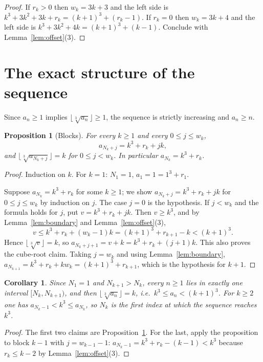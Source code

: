 \documentclass[11pt]{amsart}
\newtheorem{proposition}[theorem]{Proposition}
\newtheorem{corollary}[theorem]{Corollary}
\theoremstyle{remark}
\newcommand{\cbrt}[1]{\bigl\lfloor\sqrt[3]{#1}\bigr\rfloor}
\begin{document}
\begin{proof}
If $r_k>0$ then $w_k=3k+3$ and the left side is $k^3+3k^2+3k+r_k=(k+1)^3+(r_k-1)$.
If $r_k=0$ then $w_k=3k+4$ and the left side is $k^3+3k^2+4k=(k+1)^3+(k-1)$.
Conclude with Lemma~\ref{lem:offset}(3).
\end{proof}

\section{The exact structure of the sequence}

Since $a_n\ge1$ implies $\cbrt{a_n}\ge1$, the sequence is strictly increasing and $a_n\ge n$.

\begin{proposition}[Blocks]\label{prop:blocks}
For every $k\ge1$ and every $0\le j\le w_k$,
\[
  a_{N_k+j}=k^3+r_k+jk,
\]
and $\cbrt{a_{N_k+j}}=k$ for $0\le j<w_k$. In particular $a_{N_k}=k^3+r_k$.
\end{proposition}

\begin{proof}
Induction on $k$. For $k=1$: $N_1=1$, $a_1=1=1^3+r_1$.

Suppose $a_{N_k}=k^3+r_k$ for some $k\ge1$; we show $a_{N_k+j}=k^3+r_k+jk$ for
$0\le j\le w_k$ by induction on $j$. The case $j=0$ is the hypothesis. If $j<w_k$ and the
formula holds for $j$, put $v=k^3+r_k+jk$. Then $v\ge k^3$, and by Lemma~\ref{lem:boundary}
and Lemma~\ref{lem:offset}(3),
\[
  v\le k^3+r_k+(w_k-1)k=(k+1)^3+r_{k+1}-k<(k+1)^3 .
\]
Hence $\cbrt v=k$, so $a_{N_k+j+1}=v+k=k^3+r_k+(j+1)k$. This also proves the cube-root claim.
Taking $j=w_k$ and using Lemma~\ref{lem:boundary},
$a_{N_{k+1}}=k^3+r_k+kw_k=(k+1)^3+r_{k+1}$, which is the hypothesis for $k+1$.
\end{proof}

\begin{corollary}\label{cor:blocks}
Since $N_1=1$ and $N_{k+1}>N_k$, every $n\ge1$ lies in exactly one interval $[N_k,N_{k+1})$,
and then $\cbrt{a_n}=k$, i.e.\ $k^3\le a_n<(k+1)^3$. For $k\ge2$ one has $a_{N_k-1}<k^3\le a_{N_k}$,
so $N_k$ is the first index at which the sequence reaches $k^3$.
\end{corollary}

\begin{proof}
The first two claims are Proposition~\ref{prop:blocks}. For the last, apply the proposition to
block $k-1$ with $j=w_{k-1}-1$: $a_{N_k-1}=k^3+r_k-(k-1)<k^3$ because $r_k\le k-2$ by
Lemma~\ref{lem:offset}(3).
\end{proof}
\end{document}
